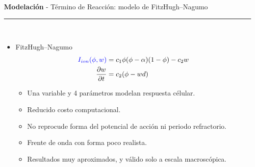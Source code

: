 \documentclass[11pt]{beamer}
\begin{document}
\begin{frame}[t]
	\vspace*{0.5 cm} \textbf{Modelación} - Término de Reacción: modelo de FitzHugh–Nagumo		
	\color{brown}\rule{\linewidth}{4pt} \\ [0.2 cm]
	
	\begin{itemize}
		\item FitzHugh–Nagumo \\
		\begin{align*}
			\color{blue}
			I_{ion}(\phi, w) &= c_1 \phi (\phi - \alpha)(1 - \phi) - c_2 w \\ 
			\dfrac{\partial w}{\partial t} &= c_2 (\phi - wd) \nonumber 
		\end{align*}		
	\begin{itemize}
		\item Una variable y 4 parámetros modelan respuesta célular. 
		\item Reducido costo computacional.
		\item No reprocude forma del potencial de acción ni periodo refractorio.
		\item Frente de onda con forma poco realista.
		\item Resultados muy aproximados, y válido solo a escala macroscópica.
	\end{itemize}		
	\end{itemize}
\end{frame}	
\end{document}

